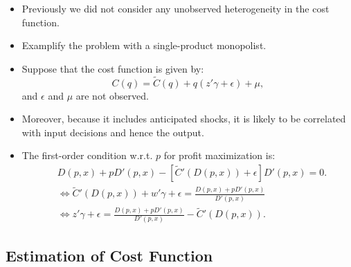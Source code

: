 \documentclass[
]{book}
\begin{document}
\begin{itemize}
\item
  Previously we did not consider any unobserved heterogeneity in the cost function.
\item
  Examplify the problem with a single-product monopolist.
\item
  Suppose that the cost function is given by:
  \begin{equation}
  C(q) = \tilde{C}(q) + q (z' \gamma + \epsilon) + \mu,
  \end{equation}
  and \(\epsilon\) and \(\mu\) are not observed.
\item
  Moreover, because it includes anticipated shocks, it is likely to be correlated with input decisions and hence the output.
\item
  The first-order condition w.r.t. \(p\) for profit maximization is:
  \begin{equation}
  \begin{split}
  &D(p, x) + pD'(p, x) - [\tilde{C}'(D(p, x)) + \epsilon]D'(p, x) = 0.\\
  &\Leftrightarrow \tilde{C}'(D(p, x)) + w'\gamma + \epsilon  = \frac{D(p, x) + pD'(p, x)}{D'(p,x)}\\
  &\Leftrightarrow z'\gamma + \epsilon = \frac{D(p, x) + pD'(p, x)}{D'(p, x)} - \tilde{C}'(D(p,  x)).
  \end{split}
  \end{equation}
\end{itemize}

\hypertarget{estimation-of-cost-function}{%
\subsection{Estimation of Cost Function}\label{estimation-of-cost-function}}
\end{document}
